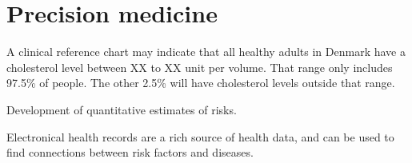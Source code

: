 \chapter{Precision medicine}

A clinical reference chart may indicate that all healthy adults in Denmark
have a cholesterol level between XX to XX unit per volume.
That range only includes 97.5\% of people.
The other 2.5\% will have cholesterol levels outside that range.

Development of quantitative estimates of risks.

Electronical health records are a rich source of health data,
and can be used to find connections between risk factors and diseases.



